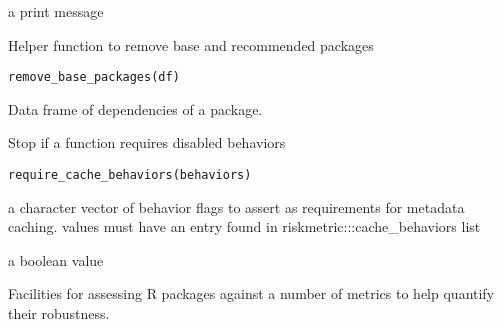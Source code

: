 \documentclass[a4paper]{book}
\begin{document}
%
\begin{Value}
a print message
\end{Value}
%
\begin{Description}
Helper function to remove base and recommended packages
\end{Description}
%
\begin{Usage}
\begin{verbatim}
remove_base_packages(df)
\end{verbatim}
\end{Usage}
%
\begin{Arguments}
\begin{ldescription}
\item[\code{df}] Data frame of dependencies of a package.
\end{ldescription}
\end{Arguments}
%
\begin{Description}
Stop if a function requires disabled behaviors
\end{Description}
%
\begin{Usage}
\begin{verbatim}
require_cache_behaviors(behaviors)
\end{verbatim}
\end{Usage}
%
\begin{Arguments}
\begin{ldescription}
\item[\code{behaviors}] a character vector of behavior flags to assert as
requirements for metadata caching. values must have an entry found in
riskmetric:::cache\_behaviors list
\end{ldescription}
\end{Arguments}
%
\begin{Value}
a boolean value
\end{Value}
%
\begin{Description}
Facilities for assessing R packages against a number of metrics to help
quantify their robustness.
\end{Description}
%
\end{document}
